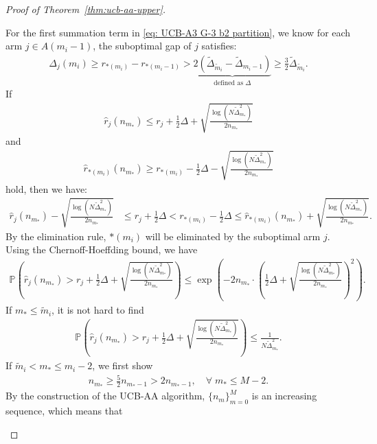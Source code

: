 \documentclass[11pt]{article}
\begin{document}
\begin{proof}[Proof of Theorem~\ref{thm:ucb-aa-upper}]
\begin{itemize}
    For the first summation term in \eqref{eq: UCB-A3 G-3 b2 partition}, we know for each arm $j\in A(m_i-1)$, the suboptimal gap of $j$ satisfies:
    \begin{align}
        \Delta_j(m_i)\geq r_{*(m_i)}-r_{*(m_i-1)}>\underbrace{2\left(\tilde{\Delta}_{\tilde{m}_i}-\tilde{\Delta}_{m_i-1}\right)}_{\text{defined as }\Delta}\geq \frac{3}{2}\tilde{\Delta}_{\tilde{m}_i}.
        \label{eq: Delta's lower bound A-3 G-3 b-2}
    \end{align}
    If
\begin{align}
    \hat{r}_j(n_{m_*}) \leq r_j +\frac{1}{2}\Delta +\sqrt{\frac{\log(N \tilde{\Delta}_{m_*}^2)}{2n_{m_*}}} \label{eq: suboptimal is bad A-3 G-3 b2}
\end{align}
and  
\begin{align}
    \hat{r}_{*(m_i)}(n_{m_*}) \geq r_{*(m_i)} -\frac{1}{2}\Delta- \sqrt{\frac{\log(N \tilde{\Delta}_{m_*}^2)}{2n_{m_*}}} 
    \label{eq: optimal is good A-3 G-3 b2}
\end{align}
hold, then we have:  
\begin{align*}
    \hat{r}_j(n_{m_*}) - \sqrt{\frac{\log(N \tilde{\Delta}_{m_*}^2)}{2n_{m_*}}} &\leq r_j + \frac{1}{2}\Delta< r_{*(m_i)} -\frac{1}{2}\Delta \leq \hat{r}_{*(m_i)}(n_{m_*}) + \sqrt{\frac{\log(N \tilde{\Delta}_{m_*}^2)}{2n_{m_*}}}.
\end{align*}
By the elimination rule, \( *(m_i) \) will be eliminated by the suboptimal arm $j$. Using the Chernoff-Hoeffding bound, we have
\begin{align*}
\!\!\!\!\!\!\!\!\!\!\!\!\!\mathbb{P}\left(\hat{r}_j(n_{m_*}) > r_j +\frac{1}{2}\Delta +\sqrt{\frac{\log(N \tilde{\Delta}_{m_*}^2)}{2n_{m_*}}}\right)\leq \exp \left(-2n_{m_*}\cdot \left(\frac{1}{2}\Delta +\sqrt{\frac{\log(N \tilde{\Delta}_{m_*}^2)}{2n_{m_*}}}\right)^2\right).
\end{align*}
If $m_*\leq \tilde{m}_i$, it is not hard to find
\begin{align*}
    \mathbb{P}\left(\hat{r}_j(n_{m_*}) > r_j +\frac{1}{2}\Delta +\sqrt{\frac{\log(N \tilde{\Delta}_{m_*}^2)}{2n_{m_*}}}\right)\leq \frac{1}{N\tilde{\Delta}_{m_*}^2}.
\end{align*}
If $\tilde{m}_i<m_*\leq m_i-2$, we first show 
\begin{align}
    n_{m_*}\geq \frac{5}{2}n_{m_*-1}>2n_{m_*-1},\quad \forall\; m_*\leq M-2.
    \label{eq: n_m doubles}
\end{align}
By the construction of the UCB-AA algorithm, $\{n_m\}_{m=0}^{M}$ is an increasing sequence, which means that

\end{itemize}
\end{proof}
\end{document}
